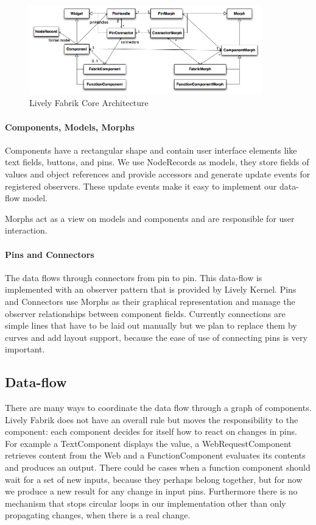 \documentclass[pdftex, times, 10pt, twocolumn]{article}
\begin{document}
\begin{figure}[]\centering
\includegraphics[width=0.900000\textwidth]{LivelyFabrikCore.png} 

\caption{Lively Fabrik Core Architecture }
\label{fig:LivelyFabrikCore}
\end{figure}


\paragraph{Components, Models, Morphs}
Components have a rectangular shape and contain user interface elements like text fields, buttons, and pins.  We use NodeRecords as models, they store fields of values and object references and provide accessors and generate update events for registered observers. These update events make it easy to implement our data-flow model.  

Morphs act as a view on models and components and are responsible for user interaction.  



\paragraph{Pins and Connectors}
The data flows through connectors from pin to pin. This data-flow is implemented with an observer pattern that is provided by Lively Kernel. Pins and Connectors use Morphs as their graphical representation and manage the observer relationships between component fields. Currently connections are simple lines that have to be laid out manually but we plan to replace them by curves and add layout support, because the ease of use of connecting pins is very important. 



\subsection{Data-flow}
There are many ways to coordinate the data flow through a graph of components. Lively Fabrik does not have an overall rule but moves the responsibility to the component: each component decides for itself how to react on changes in pins. For example a TextComponent displays the value, a WebRequestComponent retrieves content from the Web and a FunctionComponent evaluates its contents and produces an output. There could be cases when a function component should wait for a set of new inputs, because they perhaps belong together, but for now we produce a new result for any change in input pins. Furthermore there is no mechanism that stops circular loops in our implementation other than only propagating changes, when there is a real change.  
\end{document}
